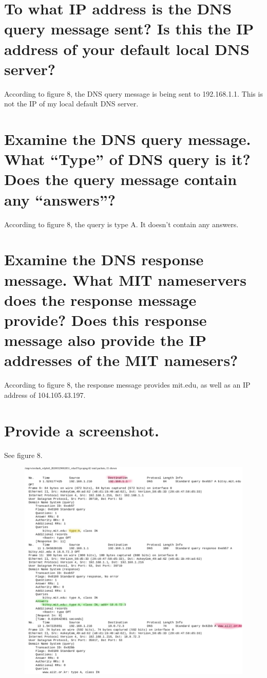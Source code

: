 \documentclass{article}
\begin{document}
\section{To what IP address is the DNS query message sent? Is this the IP address of your
default local DNS server?}
According to figure 8, the DNS query message is being sent to 192.168.1.1.  This is not the IP of my local default DNS server.\\

\section{Examine the DNS query message. What “Type” of DNS query is it? Does the
query message contain any “answers”?}
According to figure 8, the query is type A.  It doesn't contain any answers.\\

\section{Examine the DNS response message. What MIT nameservers does the response
message provide? Does this response message also provide the IP addresses of the
MIT namesers?}
According to figure 8, the response message provides mit.edu, as well as an IP address of 104.105.43.197.\\

\section{Provide a screenshot.}
See figure 8.\\

\begin{figure}[h!]
\centering
\includegraphics[scale=0.6]{Q20-23.pdf}
\caption{}
\end{figure}
\end{document}
